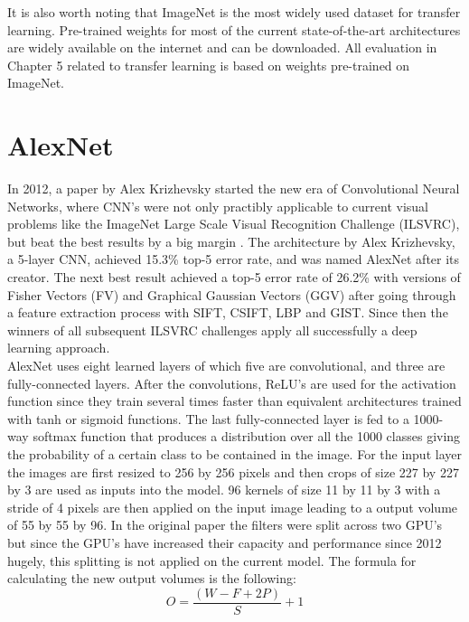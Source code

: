 It is also worth noting that ImageNet is the most widely used dataset for transfer learning. Pre-trained weights for most of the current state-of-the-art architectures are widely available on the internet and can be downloaded. All evaluation in Chapter 5 related to transfer learning is based on weights pre-trained on ImageNet.

\section{AlexNet}

In 2012, a paper by Alex Krizhevsky started the new era of Convolutional Neural Networks, where CNN's were not only practibly applicable to current visual problems like the ImageNet Large Scale Visual Recognition Challenge (ILSVRC), but beat the best results by a big margin \cite{krizhevsky2012imagenet, imagenet}. The architecture by Alex Krizhevsky, a 5-layer CNN, achieved 15.3\% top-5 error rate, and was named AlexNet after its creator. The next best result achieved a top-5 error rate of 26.2\% with versions of Fisher Vectors (FV) and Graphical Gaussian Vectors (GGV) after going through a feature extraction process with SIFT, CSIFT, LBP and GIST. Since then the winners of all subsequent ILSVRC challenges apply all successfully a deep learning approach. \\

AlexNet uses eight learned layers of which five are convolutional, and three are fully-connected layers. After the convolutions, ReLU's are used for the activation function since they train several times faster than equivalent architectures trained with tanh or sigmoid functions. The last fully-connected layer is fed to a 1000-way softmax function that produces a distribution over all the 1000 classes giving the probability of a certain class to be contained in the image. For the input layer the images are first resized to 256 by 256 pixels and then crops of size 227 by 227 by 3 are used as inputs into the model. 96 kernels of size 11 by 11 by 3 with a stride of 4 pixels are then applied on the input image leading to a output volume of 55 by 55 by 96. In the original paper the filters were split across two GPU's but since the GPU's have increased their capacity and performance since 2012 hugely, this splitting is not applied on the current model. The formula for calculating the new output volumes is the following: \\

\[ O = {\frac{(W - F + 2P)}{S}} + 1 \] \\


